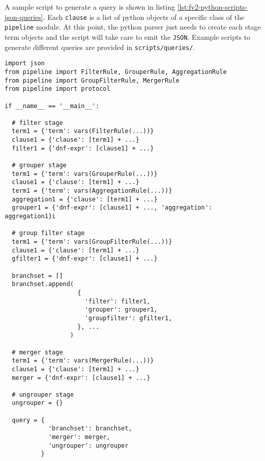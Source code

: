 A sample script to generate a query is shown in listing
\ref{lst:fv2-python-scripts-json-queries}. Each \texttt{clause} is a list of
python objects of a specific class of the \texttt{pipeline} module. At this
point,  the python parser just needs to create each
stage term objects and the script will take care to emit the \texttt{JSON}.
Example scripts to generate different queries are provided in
\texttt{scripts/queries/}.


\begin{lstlisting}
import json
from pipeline import FilterRule, GrouperRule, AggregationRule
from pipeline import GroupFilterRule, MergerRule
from pipeline import protocol

if __name__ == '__main__':

  # filter stage
  term1 = {'term': vars(FilterRule(...))}
  clause1 = {'clause': [term1] + ...}
  filter1 = {'dnf-expr': [clause1] + ...}

  # grouper stage
  term1 = {'term': vars(GrouperRule(...))}
  clause1 = {'clause': [term1] + ...}
  term1 = {'term': vars(AggregationRule(...))}
  aggregation1 = {'clause': [term1] + ...}
  grouper1 = {'dnf-expr': [clause1] + ..., 'aggregation': aggregation1}i

  # group filter stage
  term1 = {'term': vars(GroupFilterRule(...))}
  clause1 = {'clause': [term1] + ...}
  gfilter1 = {'dnf-expr': [clause1] + ...}

  branchset = []
  branchset.append(
                    {
                      'filter': filter1,
                      'grouper': grouper1,
                      'groupfilter': gfilter1,
                    }, ...
                  )

  # merger stage
  term1 = {'term': vars(MergerRule(...))}
  clause1 = {'clause': [term1] + ...}
  merger = {'dnf-expr': [clause1] + ...}

  # ungrouper stage
  ungrouper = {}

  query = {
            'branchset': branchset,
            'merger': merger,
            'ungrouper': ungrouper
          }
\end{lstlisting}






